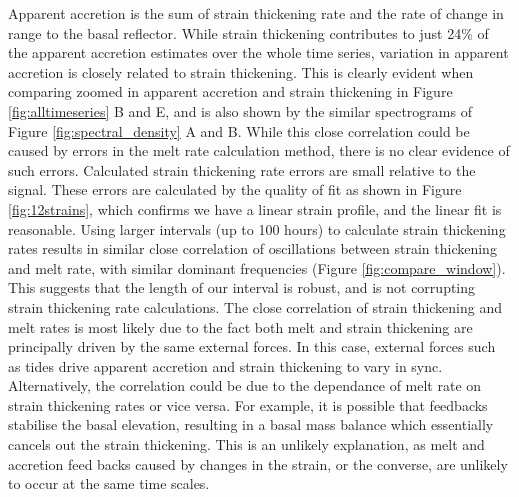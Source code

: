 Apparent accretion is the sum of strain thickening rate and the rate of change in range to the basal reflector. While strain thickening contributes to just 24\% of the apparent accretion estimates over the whole time series, variation in apparent accretion is closely related to strain thickening. This is clearly evident when comparing zoomed in apparent accretion and strain thickening in Figure \ref{fig:alltimeseries} B and E, and is also shown by the similar spectrograms of Figure \ref{fig:spectral_density} A and B. While this close correlation could be caused by errors in the melt rate calculation method, there is no clear evidence of such errors. Calculated strain thickening rate errors are small relative to the signal. These errors are calculated by the quality of fit as shown in Figure \ref{fig:12strains}, which confirms we have a linear strain profile, and the linear fit is reasonable. 
Using larger intervals (up to 100 hours) to calculate strain thickening rates results in similar close correlation of oscillations between strain thickening and melt rate, with similar dominant frequencies (Figure \ref{fig:compare_window}). This suggests that the length of our interval is robust, and is not corrupting strain thickening rate calculations. 
The close correlation of strain thickening and melt rates is most likely due to the fact both melt and strain thickening are principally driven by the same external forces. In this case, external forces such as tides drive apparent accretion and strain thickening to vary in sync. Alternatively, the correlation could be due to the dependance of melt rate on strain thickening rates or vice versa.  For example, it is possible that feedbacks stabilise the basal elevation,  resulting in a basal mass balance which essentially cancels out the strain thickening. This is an unlikely explanation, as melt and accretion feed backs caused by changes in the strain, or the converse, are unlikely to occur at the same time scales. 

